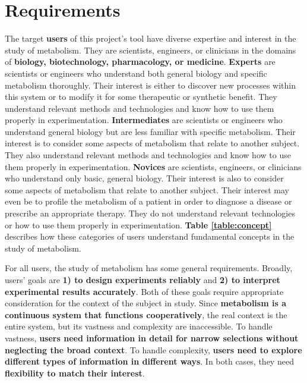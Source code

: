 

\section{Requirements}






The target \textbf{users} of this project's tool have diverse expertise and interest in the study of metabolism.
They are scientists, engineers, or clinicians in the domains of \textbf{biology, biotechnology, pharmacology, or medicine}.
\textbf{Experts} are scientists or engineers who understand both general biology and specific metabolism thoroughly.
Their interest is either to discover new processes within this system or to modify it for some therapeutic or synthetic benefit.
They understand relevant methods and technologies and know how to use them properly in experimentation.
\textbf{Intermediates} are scientists or engineers who understand general biology but are less familiar with specific metabolism.
Their interest is to consider some aspects of metabolism that relate to another subject.
They also understand relevant methods and technologies and know how to use them properly in experimentation.
\textbf{Novices} are scientists, engineers, or clinicians who understand only basic, general biology.
Their interest is also to consider some aspects of metabolism that relate to another subject.
Their interest may even be to profile the metabolism of a patient in order to diagnose a disease or prescribe an appropriate therapy.
They do not understand relevant technologies or how to use them properly in experimentation.
\textbf{Table \ref{table:concept}} describes how these categories of users understand fundamental concepts in the study of metabolism.


For all users, the study of metabolism has some general requirements.
Broadly, users' goals are \textbf{1) to design experiments reliably} and \textbf{2) to interpret experimental results accurately}.
Both of these goals require appropriate consideration for the context of the subject in study.
Since \textbf{metabolism is a continuous system that functions cooperatively}, the real context is the entire system, but its vastness and complexity are inaccessible.
To handle vastness, \textbf{users need information in detail for narrow selections without neglecting the broad context}.
To handle complexity, \textbf{users need to explore different types of information in different ways}.
In both cases, they need \textbf{flexibility to match their interest}.

